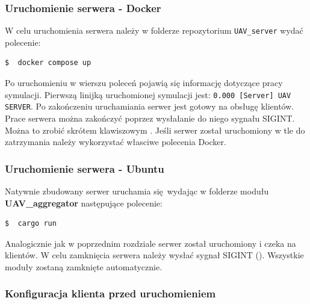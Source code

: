 \documentclass[15pt]{sprawozdanie}
\begin{document}
\subsubsection{Uruchomienie serwera - Docker}

W celu uruchomienia serwera należy w folderze repozytorium \texttt{UAV\_server} wydać polecenie:
\begin{lstlisting}[language=bash]
  $  docker compose up
\end{lstlisting}
Po uruchomieniu w wierszu poleceń pojawią się informację dotyczące pracy symulacji. Pierwszą linijką uruchomionej symulacji jest: \texttt{0.000 [Server] UAV SERVER}. Po zakończeniu uruchamiania serwer jest gotowy na obsługę klientów.\\

Prace serwera można zakończyć poprzez wysłałanie do niego sygnału SIGINT. Można to zrobić skrótem klawiszowym . Jeśli serwer został uruchomiony w tle do zatrzymania należy wykorzystać własciwe polecenia Docker.

\subsubsection{Uruchomienie serwera - Ubuntu}

Natywnie zbudowany serwer uruchamia się wydając w folderze modułu\\ \textbf{UAV\_aggregator} następujące polecenie:
\begin{lstlisting}[language=bash]
  $  cargo run
\end{lstlisting}

Analogicznie jak w poprzednim rozdziale serwer został uruchomiony i czeka na klientów. W celu zamknięcia serwera należy wysłać sygnał SIGINT (). Wszystkie moduły zostaną zamknięte automatycznie.

\subsubsection{Konfiguracja klienta przed uruchomieniem}
\label{fastClient}
\end{document}
